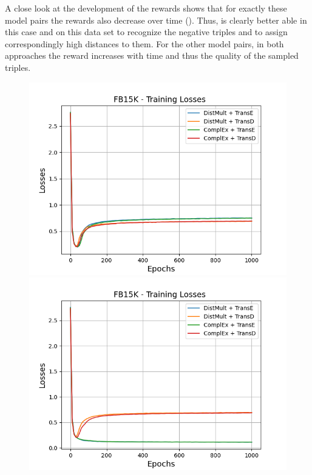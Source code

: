A close look at the development of the rewards shows that for exactly these model pairs the rewards also decrease over time ().
Thus, \transe is clearly better able in this case and on this data set to recognize the negative triples and to assign correspondingly high distances to them.
For the other model pairs, in both approaches the reward increases with time and thus the quality of the sampled triples.
\clearpage
\begin{figure}[H]
    \centering
    \begin{minipage}{.5\textwidth}
      \centering
      \includegraphics[width=0.9\linewidth]{figures/results/gan_train/not_pretrained/random/fb15k/1k_epochs/random_fb15k_losses.png}
    \end{minipage}%
    \begin{minipage}{.5\textwidth}
      \centering
      \includegraphics[width=0.9\linewidth]{figures/results/gan_train/not_pretrained/uncertainty/max_distribution/entropy/fb15k/1k_epochs/uncertainty_fb15k_losses.png}

\end{minipage}
\end{figure}
